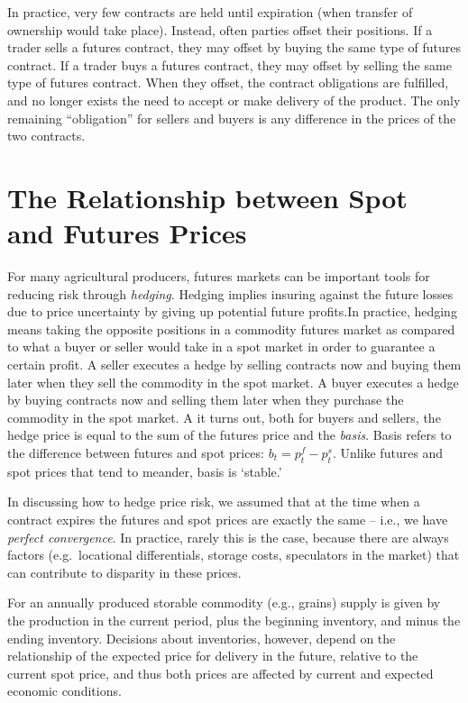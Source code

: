 \documentclass[]{book}
\begin{document}
In practice, very few contracts are held until expiration (when transfer
of ownership would take place). Instead, often parties offset their
positions. If a trader sells a futures contract, they may offset by
buying the same type of futures contract. If a trader buys a futures
contract, they may offset by selling the same type of futures contract.
When they offset, the contract obligations are fulfilled, and no longer
exists the need to accept or make delivery of the product. The only
remaining ``obligation'' for sellers and buyers is any difference in the
prices of the two contracts.

\section{The Relationship between Spot and Futures
Prices}\label{the-relationship-between-spot-and-futures-prices}

For many agricultural producers, futures markets can be important tools
for reducing risk through \emph{hedging}. Hedging implies insuring
against the future losses due to price uncertainty by giving up
potential future profits.In practice, hedging means taking the opposite
positions in a commodity futures market as compared to what a buyer or
seller would take in a spot market in order to guarantee a certain
profit. A seller executes a hedge by selling contracts now and buying
them later when they sell the commodity in the spot market. A buyer
executes a hedge by buying contracts now and selling them later when
they purchase the commodity in the spot market. A it turns out, both for
buyers and sellers, the hedge price is equal to the sum of the futures
price and the \emph{basis}. Basis refers to the difference between
futures and spot prices: \(b_{t} = p_{t}^{f}-p_{t}^{s}\). Unlike futures
and spot prices that tend to meander, basis is `stable.'

In discussing how to hedge price risk, we assumed that at the time when
a contract expires the futures and spot prices are exactly the same --
i.e., we have \textit{perfect convergence}. In practice, rarely this is
the case, because there are always factors (e.g.~locational
differentials, storage costs, speculators in the market) that can
contribute to disparity in these prices.

For an annually produced storable commodity (e.g., grains) supply is
given by the production in the current period, plus the beginning
inventory, and minus the ending inventory. Decisions about inventories,
however, depend on the relationship of the expected price for delivery
in the future, relative to the current spot price, and thus both prices
are affected by current and expected economic conditions.
\end{document}
